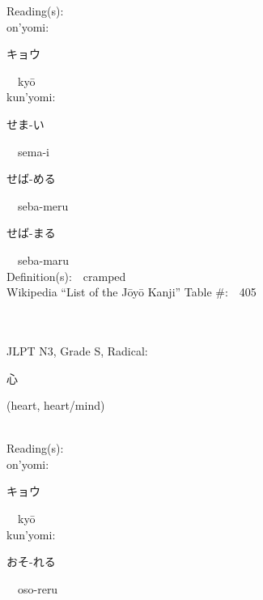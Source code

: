 \begin{multicols}{2}
Reading(s):\ \ \\
{\hspace*{1em}}on'yomi:\ \ \\
{\hspace*{2em}}{\begin{CJK}{UTF8}{min} キョウ \end{CJK}}\ \ ky\=o\ \ \\
{\hspace*{1em}}kun'yomi:\ \ \\
{\hspace*{2em}}{\begin{CJK}{UTF8}{min} せま-い \end{CJK}}\ \ sema-i\ \ \\
{\hspace*{2em}}{\begin{CJK}{UTF8}{min} せば-める \end{CJK}}\ \ seba-meru\ \ \\
{\hspace*{2em}}{\begin{CJK}{UTF8}{min} せば-まる \end{CJK}}\ \ seba-maru\ \ \\
Definition(s):\ \ cramped \\
Wikipedia ``List of the J\=oy\=o Kanji'' Table \#:\ \ 405 \\
\ \ \\
{\fontsize{34pt}{40pt}  }\ \ \\  %
{JLPT N3, Grade S, Radical:\ \ {\begin{CJK}{UTF8}{min} 心 \end{CJK}} (heart, heart/mind) } \\
Reading(s):\ \ \\
{\hspace*{1em}}on'yomi:\ \ \\
{\hspace*{2em}}{\begin{CJK}{UTF8}{min} キョウ \end{CJK}}\ \ ky\=o\ \ \\
{\hspace*{1em}}kun'yomi:\ \ \\
{\hspace*{2em}}{\begin{CJK}{UTF8}{min} おそ-れる \end{CJK}}\ \ oso-reru\ \ \\

\end{multicols}
